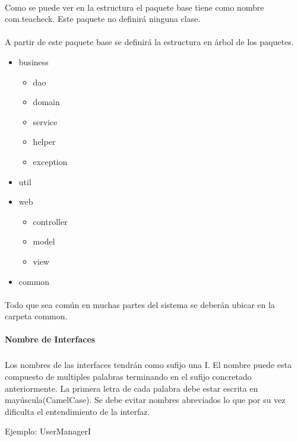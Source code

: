 \paragraph{}
Como se puede ver en la estructura el paquete base tiene como nombre com.teacheck. Este paquete no definirá ninguna clase. 

\paragraph{}
A partir de este paquete base se definirá la estructura en árbol de los paquetes.

\begin{itemize}
\item
  business
  \begin{itemize}
  \item
    dao
  \item
    domain
  \item
    service
  \item
    helper
  \item
    exception
  \end{itemize}
\item
  util
\item
  web
  \begin{itemize}
  \item
    controller
  \item
    model
  \item
    view
  \end{itemize}
\item
  common
\end{itemize}

\paragraph{}
Todo que sea común en muchas partes del sistema se deberán ubicar en la carpeta common.

\paragraph{Nombre de Interfaces}
\subparagraph{}
Los nombres de las interfaces tendrán como sufijo una I. El nombre puede esta compuesto de multiples palabras terminando en el sufijo concretado anteriormente. La primera letra de cada palabra debe estar escrita en mayúscula(CamelCase). Se debe evitar nombres abreviados lo que por su vez dificulta el entendimiento de la interfaz.

Ejemplo: UserManagerI

